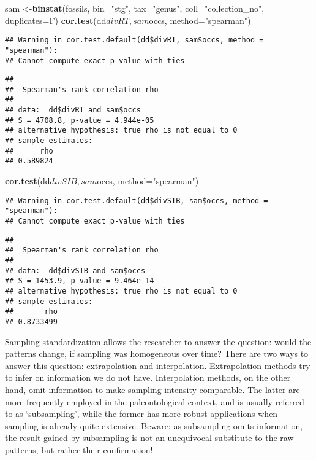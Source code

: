\documentclass[]{article}
\newenvironment{Shaded}{\begin{snugshade}}{\end{snugshade}}
\newcommand{\KeywordTok}[1]{\textcolor[rgb]{0.13,0.29,0.53}{\textbf{{#1}}}}
\newcommand{\DataTypeTok}[1]{\textcolor[rgb]{0.13,0.29,0.53}{{#1}}}
\newcommand{\StringTok}[1]{\textcolor[rgb]{0.31,0.60,0.02}{{#1}}}
\newcommand{\NormalTok}[1]{{#1}}
\begin{document}
\begin{Shaded}
\begin{Highlighting}[]
\NormalTok{sam <-}\KeywordTok{binstat}\NormalTok{(fossils, }\DataTypeTok{bin=}\StringTok{"stg"}\NormalTok{, }\DataTypeTok{tax=}\StringTok{"genus"}\NormalTok{, }\DataTypeTok{coll=}\StringTok{"collection_no"}\NormalTok{, }\DataTypeTok{duplicates=}\NormalTok{F)}
\KeywordTok{cor.test}\NormalTok{(dd$divRT, sam$occs, }\DataTypeTok{method=}\StringTok{"spearman"}\NormalTok{)}
\end{Highlighting}
\end{Shaded}

\begin{verbatim}
## Warning in cor.test.default(dd$divRT, sam$occs, method = "spearman"):
## Cannot compute exact p-value with ties
\end{verbatim}

\begin{verbatim}
## 
##  Spearman's rank correlation rho
## 
## data:  dd$divRT and sam$occs
## S = 4708.8, p-value = 4.944e-05
## alternative hypothesis: true rho is not equal to 0
## sample estimates:
##      rho 
## 0.589824
\end{verbatim}

\begin{Shaded}
\begin{Highlighting}[]
\KeywordTok{cor.test}\NormalTok{(dd$divSIB, sam$occs, }\DataTypeTok{method=}\StringTok{"spearman"}\NormalTok{)}
\end{Highlighting}
\end{Shaded}

\begin{verbatim}
## Warning in cor.test.default(dd$divSIB, sam$occs, method = "spearman"):
## Cannot compute exact p-value with ties
\end{verbatim}

\begin{verbatim}
## 
##  Spearman's rank correlation rho
## 
## data:  dd$divSIB and sam$occs
## S = 1453.9, p-value = 9.464e-14
## alternative hypothesis: true rho is not equal to 0
## sample estimates:
##       rho 
## 0.8733499
\end{verbatim}

Sampling standardization allows the researcher to answer the question:
would the patterns change, if sampling was homogeneous over time? There
are two ways to answer this question: extrapolation and interpolation.
Extrapolation methods try to infer on information we do not have.
Interpolation methods, on the other hand, omit information to make
sampling intensity comparable. The latter are more frequently employed
in the paleontological context, and is usually referred to as
`subsampling', while the former has more robust applications when
sampling is already quite extensive. Beware: as subsampling omits
information, the result gained by subsampling is not an unequivocal
substitute to the raw patterns, but rather their confirmation!
\end{document}
